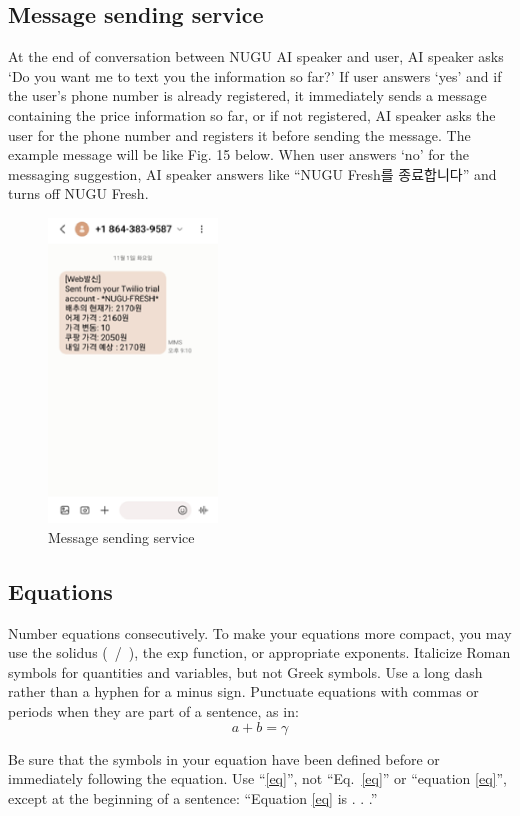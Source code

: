\documentclass[conference]{IEEEtran}
\begin{document}
\subsection{Message sending service}
At the end of conversation between NUGU AI speaker and user, AI speaker asks ‘Do you want me to text you the information so far?’ If user answers ‘yes’ and if the user's phone number is already registered, it immediately sends a message containing the price information so far, or if not registered, AI speaker asks the user for the phone number and registers it before sending the message. The example message will be like Fig. 15 below. When user answers ‘no’ for the messaging suggestion, AI speaker answers like “NUGU Fresh를 종료합니다” and turns off NUGU Fresh.

\begin{figure}[h]
\centering
    \includegraphics[width =4.5cm]{1-6.eps}
    \hfil
\caption{Message sending service}
\end{figure}
\newpage

\subsection{Equations}
Number equations consecutively. To make your 
equations more compact, you may use the solidus (~/~), the exp function, or 
appropriate exponents. Italicize Roman symbols for quantities and variables, 
but not Greek symbols. Use a long dash rather than a hyphen for a minus 
sign. Punctuate equations with commas or periods when they are part of a 
sentence, as in:
\begin{equation}
a+b=\gamma\label{eq}
\end{equation}

Be sure that the 
symbols in your equation have been defined before or immediately following 
the equation. Use ``\eqref{eq}'', not ``Eq.~\eqref{eq}'' or ``equation \eqref{eq}'', except at 
the beginning of a sentence: ``Equation \eqref{eq} is . . .''
\end{document}
